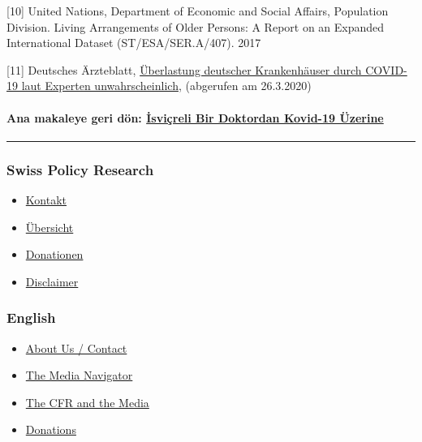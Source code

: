 {[}10{]} United Nations, Department of Economic and Social Affairs,
Population Division. Living Arrange­ments of Older Persons: A Report on
an Expanded International Dataset (ST/ESA/SER.A/407). 2017

{[}11{]} Deutsches Ärzteblatt,
\href{https://www.aerzteblatt.de/nachrichten/111029/Ueberlastung-deutscher-Krankenhaeuser-durch-COVID-19-laut-Experten-unwahrscheinlich}{Überlastung
deutscher Krankenhäuser durch COVID-19 laut Experten unwahrscheinlich},
(abgerufen am 26.3.2020)

\hypertarget{ana-makaleye-geri-duxf6n-isviuxe7reli-bir-doktordan-kovid-19-uxfczerine}{%
\paragraph{\texorpdfstring{Ana makaleye geri dön:
\href{https://swprs.org/isvicreli-bir-doktordan-kovid-19-uezerine/}{İsviçreli
Bir Doktordan Kovid-19
Üzerine}}{Ana makaleye geri dön: İsviçreli Bir Doktordan Kovid-19 Üzerine}}\label{ana-makaleye-geri-duxf6n-isviuxe7reli-bir-doktordan-kovid-19-uxfczerine}}

\begin{center}\rule{0.5\linewidth}{\linethickness}\end{center}

\hypertarget{swiss-policy-research}{%
\subsubsection{Swiss Policy Research}\label{swiss-policy-research}}

\begin{itemize}
\tightlist
\item
  \href{https://swprs.org/kontakt/}{Kontakt}
\item
  \href{https://swprs.org/uebersicht/}{Übersicht}
\item
  \href{https://swprs.org/donationen/}{Donationen}
\item
  \href{https://swprs.org/disclaimer/}{Disclaimer}
\end{itemize}

\hypertarget{english}{%
\subsubsection{English}\label{english}}

\begin{itemize}
\tightlist
\item
  \href{https://swprs.org/contact/}{About Us / Contact}
\item
  \href{https://swprs.org/media-navigator/}{The Media Navigator}
\item
  \href{https://swprs.org/the-american-empire-and-its-media/}{The CFR
  and the Media}
\item
  \href{https://swprs.org/donations/}{Donations}
\end{itemize}


